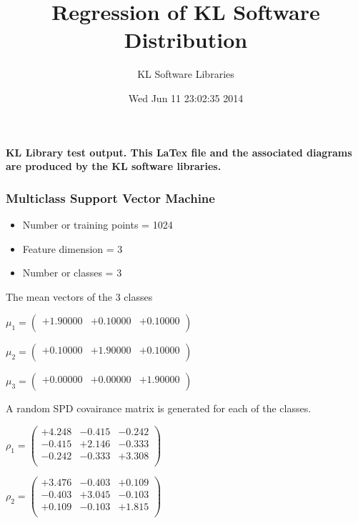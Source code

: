 \documentclass[9pt]{article}
\theoremstyle{plain}
\theoremstyle{definition}
\theoremstyle{remark}
\numberwithin{equation}{section}
\begin{document}
\title{Regression of KL Software Distribution   }
\author{KL Software Libraries}
\date{Wed Jun 11 23:02:35 2014
}
\maketitle
\textbf{ KL Library test output.  This LaTex file and the associated diagrams are produced by the KL software libraries.}
\subsubsection{Multiclass Support Vector Machine }
\begin{itemize}
\item Number or training points = 1024
\item Feature dimension = 3
\item Number or classes = 3
\end{itemize}
{The mean vectors of the 3 classes}

$\mu_1 = \left(
\begin{array}{
ccc}
+1.90000 & +0.10000 & +0.10000 \\
\end{array}
\right)$ \newline 

$\mu_2 = \left(
\begin{array}{
ccc}
+0.10000 & +1.90000 & +0.10000 \\
\end{array}
\right)$ \newline 

$\mu_3 = \left(
\begin{array}{
ccc}
+0.00000 & +0.00000 & +1.90000 \\
\end{array}
\right)$ \newline 

A random SPD covairance matrix is generated for each of the classes.\newline

$\rho_1 = \left(
\begin{array}{
ccc}
+4.248 & -0.415 & -0.242 \\
-0.415 & +2.146 & -0.333 \\
-0.242 & -0.333 & +3.308 \\
\end{array}
\right)$ \newline 

$\rho_2 = \left(
\begin{array}{
ccc}
+3.476 & -0.403 & +0.109 \\
-0.403 & +3.045 & -0.103 \\
+0.109 & -0.103 & +1.815 \\
\end{array}
\right)$ \newline 
\end{document}
